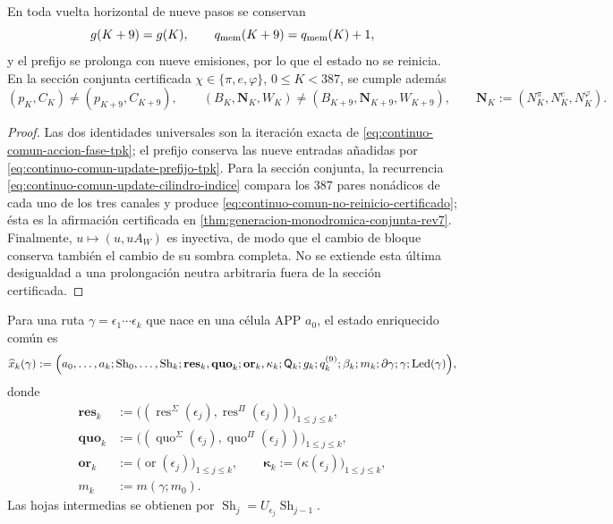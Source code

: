 \begin{proposition}
\label{prop:continuo-comun-no-reinicio-alcance}
En toda vuelta horizontal de nueve pasos se conservan
\[
 g(K+9)=g(K),\qquad
 q_{\rm mem}(K+9)=q_{\rm mem}(K)+1,
\]
y el prefijo se prolonga con nueve emisiones, por lo que el estado no se
reinicia. En la sección conjunta certificada
\(\chi\in\{\pi,e,\varphi\}\), \(0\leq K<387\), se cumple además
\begin{equation}
\label{eq:continuo-comun-no-reinicio-certificado}
 (p_K,C_K)\neq(p_{K+9},C_{K+9}),\qquad
 (B_K,\mathbf N_K,W_K)\neq
 (B_{K+9},\mathbf N_{K+9},W_{K+9}),
 \qquad
 \mathbf N_K:=(N_K^\pi,N_K^e,N_K^\varphi).
\end{equation}
\end{proposition}

\begin{proof}
Las dos identidades universales son la iteración exacta de
\eqref{eq:continuo-comun-accion-fase-tpk}; el prefijo conserva las nueve
entradas añadidas por \eqref{eq:continuo-comun-update-prefijo-tpk}. Para la
sección conjunta, la recurrencia
\eqref{eq:continuo-comun-update-cilindro-indice} compara los \(387\) pares
nonádicos de cada uno de los tres canales y produce
\eqref{eq:continuo-comun-no-reinicio-certificado}; ésta es la afirmación
certificada en
\cref{thm:generacion-monodromica-conjunta-rev7}. Finalmente,
\(u\mapsto(u,uA_W)\) es inyectiva, de modo que el cambio de bloque conserva
también el cambio de su sombra completa. No se extiende esta última
desigualdad a una prolongación neutra arbitraria fuera de la sección
certificada.
\end{proof}

\begin{definition}
\label{def:continuo-comun-estado}
Para una ruta \(\gamma=\epsilon_1\cdots\epsilon_k\) que nace en una célula
APP \(a_0\), el estado enriquecido común es
\begin{equation}
\label{eq:continuo-comun-estado}
 \widehat x_k(\gamma):=\Bigl(
  a_0,\ldots,a_k;
  \operatorname{Sh}_0,\ldots,\operatorname{Sh}_k;
  \mathbf{res}_k,\mathbf{quo}_k;
  \mathbf{or}_k,\mathbf\kappa_k;
  \mathsf Q_k;g_k;q^{(9)}_k;\beta_k;m_k;\partial\gamma;\gamma;
  \operatorname{Led}(\gamma)
 \Bigr),
\end{equation}
donde
\begin{align*}
 \mathbf{res}_k
 &:=\bigl(
  (\operatorname{res}^{\Sigma}(\epsilon_j),
   \operatorname{res}^{\Pi}(\epsilon_j))
  \bigr)_{1\leq j\leq k},\\
 \mathbf{quo}_k
 &:=\bigl(
  (\operatorname{quo}^{\Sigma}(\epsilon_j),
   \operatorname{quo}^{\Pi}(\epsilon_j))
  \bigr)_{1\leq j\leq k},\\
 \mathbf{or}_k
 &:=\bigl(\operatorname{or}(\epsilon_j)\bigr)_{1\leq j\leq k},
 \qquad
 \mathbf\kappa_k
 :=\bigl(\kappa(\epsilon_j)\bigr)_{1\leq j\leq k},\\
 m_k&:=m(\gamma;m_0).
\end{align*}
Las hojas intermedias se obtienen por
\(\operatorname{Sh}_{j}=U_{\epsilon_j}\operatorname{Sh}_{j-1}\).
\end{definition}

